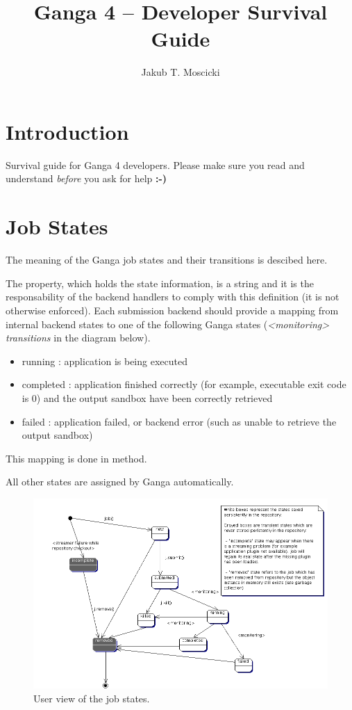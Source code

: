 \documentclass{howto}
\title{Ganga 4 -- Developer Survival Guide}
\author{Jakub T. Moscicki}
\begin{document}
\maketitle
\tableofcontents

\section{Introduction}
\noindent

Survival guide for Ganga 4 developers. Please make sure you read and understand {\em before}
you ask for help {\bf:-)}

\section{Job States}

The meaning of the Ganga  job states and their transitions is descibed
here.

The  property, which  holds the state information, is
a  string and  it is  the responsability  of the  backend  handlers to
comply  with this  definition (it  is not  otherwise  enforced).  Each
submission  backend should  provide  a mapping  from internal  backend
states  to  one  of  the  following Ganga  states  ({\em  <monitoring>
transitions} in the diagram below).

\begin{itemize}
\item running : application is being executed
\item  completed  :   application  finished  correctly  (for  example,
      executable  exit code  is 0)  and the  output sandbox  have been
      correctly retrieved
\item failed : application failed, or backend error (such as unable to
      retrieve the output sandbox)
\end{itemize}

This  mapping is done  in 
method.

All other states are assigned by Ganga automatically.

\begin{figure}
  \centering
  \includegraphics[width=5in,bb=0 0 1000 800]{./user-states.gif}
  \caption{User view of the job states.}
\end{figure}
\end{document}
